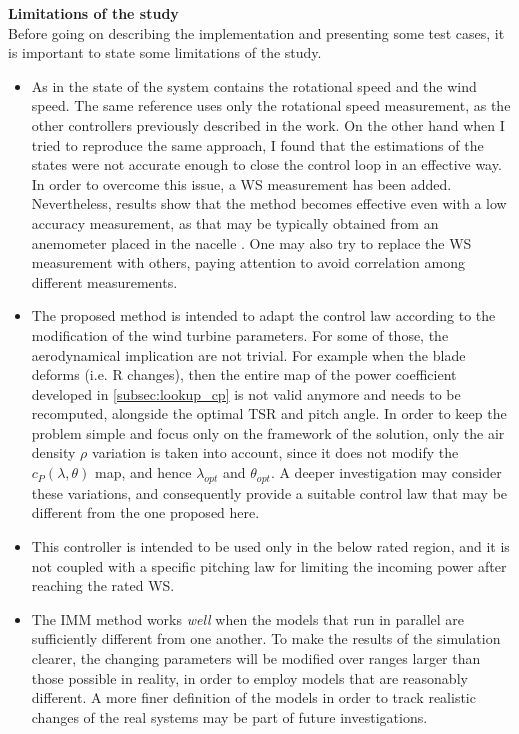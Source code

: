 \textbf{Limitations of the study}\\
Before going on describing the implementation and presenting some test cases, it is important to state some limitations of the study.
\begin{itemize}
  \item As in \cite{kalman_based_IMM} the state of the system contains the rotational speed and the wind speed. The same reference uses only the rotational speed measurement, as the other controllers previously described in the work. On the other hand when I tried to reproduce the same approach, I found that the estimations of the states were not accurate enough to close the control loop in an effective way. In order to overcome this issue, a WS measurement has been added. Nevertheless, results show that the method becomes effective even with a low accuracy measurement, as that may be typically obtained from an anemometer placed in the nacelle \cite{anemometer}.
  One may also try to replace the WS measurement with others, paying attention to avoid correlation among different measurements.
  \item The proposed method is intended to adapt the control law according to the modification of the wind turbine parameters. For some of those, the aerodynamical implication are not trivial. For example when the blade deforms (i.e. R changes), then the entire map of the power coefficient developed in \autoref{subsec:lookup_cp} is not valid anymore and needs to be recomputed, alongside the optimal TSR and pitch angle. In order to keep the problem simple and focus only on the framework of the solution, only the air density $\rho$ variation is taken into account, since it does not modify the $c_P(\lambda,\theta)$ map, and hence $\lambda_{opt}$ and $\theta_{opt}$. A deeper investigation may consider these variations, and consequently provide a suitable control law that may be different from the one proposed here. 
  \item This controller is intended to be used only in the below rated region, and it is not coupled with a specific pitching law for limiting the incoming power after reaching the rated WS.
  \item The IMM method works \textit{well} when the models that run in parallel are sufficiently different from one another. To make the results of the simulation clearer, the changing parameters will be modified over ranges larger than those possible in reality, in order to employ models that are reasonably different. A more finer definition of the models in order to track realistic changes of the real systems may be part of future investigations. 
\end{itemize} 

